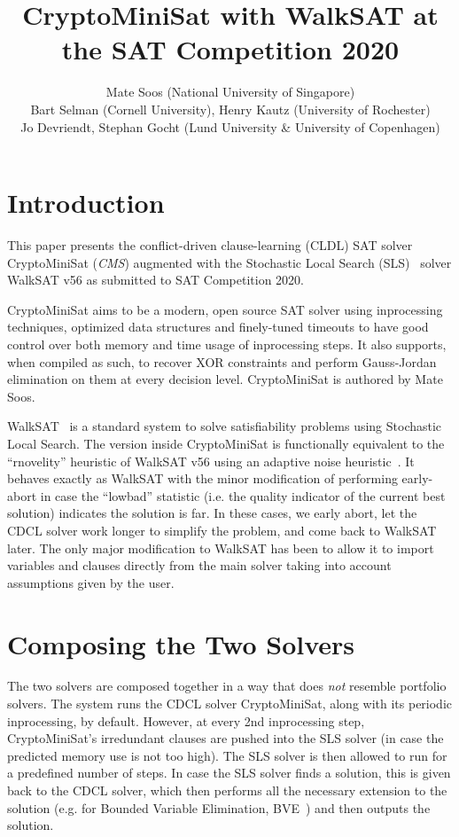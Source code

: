 \documentclass[final]{ieee}
\begin{document}
\title{CryptoMiniSat with WalkSAT at the SAT Competition 2020}
\author{Mate Soos (National University of Singapore)\\
Bart Selman (Cornell University), Henry Kautz (University of Rochester)\\
Jo Devriendt, Stephan Gocht (Lund University \& University of Copenhagen)}

\maketitle
\thispagestyle{empty}
\pagestyle{empty}

\section{Introduction}
This paper presents the conflict-driven clause-learning (CLDL) SAT solver CryptoMiniSat (\emph{CMS}) augmented with the Stochastic Local Search (SLS)~\cite{Selman95localsearch} solver WalkSAT v56 as submitted to SAT Competition 2020.

CryptoMiniSat aims to be a modern, open source SAT solver using inprocessing techniques, optimized data structures and finely-tuned timeouts to have good control over both memory and time usage of inprocessing steps. It also supports, when compiled as such, to recover XOR constraints and perform Gauss-Jordan elimination on them at every decision level. CryptoMiniSat is authored by Mate Soos.

WalkSAT~\cite{DBLP:conf/aaai/KautzS96} is a standard system to solve satisfiability problems using Stochastic Local Search. The version inside CryptoMiniSat is functionally equivalent to the ``rnovelity'' heuristic of WalkSAT v56 using an adaptive noise heuristic~\cite{DBLP:conf/aaai/Hoos02}. It behaves exactly as WalkSAT with the minor modification of performing early-abort in case the ``lowbad'' statistic (i.e. the quality indicator of the current best solution) indicates the solution is far. In these cases, we early abort, let the CDCL solver work longer to simplify the problem, and come back to WalkSAT later. The only major modification to WalkSAT has been to allow it to import variables and clauses directly from the main solver taking into account assumptions given by the user.

\section{Composing the Two Solvers}
The two solvers are composed together in a way that does \emph{not} resemble portfolio solvers. The system runs the CDCL solver CryptoMiniSat, along with its periodic inprocessing, by default. However, at every 2nd inprocessing step, CryptoMiniSat's irredundant clauses are pushed into the SLS solver (in case the predicted memory use is not too high). The SLS solver is then allowed to run for a predefined number of steps. In case the SLS solver finds a solution, this is given back to the CDCL solver, which then performs all the necessary extension to the solution (e.g. for Bounded Variable Elimination, BVE~\cite{BVE}) and then outputs the solution.
\end{document}
